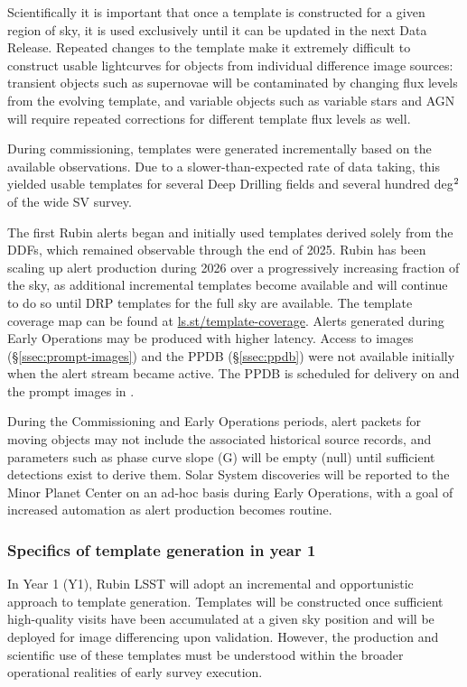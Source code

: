 Scientifically it is important that once a template is constructed for a given region of sky, it is used exclusively until it can be updated in the next Data Release.
Repeated changes to the template make it extremely difficult to construct usable lightcurves for objects from individual difference image sources: transient objects such as supernovae will be contaminated by changing flux levels from the evolving template, and variable objects such as variable stars and AGN will require repeated corrections for different template flux levels as well.

During commissioning, templates were generated incrementally based on the available observations.
Due to a slower-than-expected rate of data taking, this yielded usable templates for several Deep Drilling fields and several hundred deg$^{\rm 2}$ of the wide SV survey.

The first Rubin alerts began \rubinfirstalerts{} and initially used templates derived solely from the DDFs, which remained observable through the end of 2025.
Rubin has been scaling up alert production during 2026 over a progressively increasing fraction of the sky, as additional incremental templates become available and will continue to do so until DRP templates for the full sky are available.
The template coverage map can be found at \url{ls.st/template-coverage}.
Alerts generated during Early Operations may be produced with higher latency.
Access to images (\S\ref{ssec:prompt-images}) and the PPDB (\S\ref{ssec:ppdb}) were not available initially when the alert stream became active.
The PPDB is scheduled for delivery on \ppdbdate and the prompt images in  \npcdate.

During the Commissioning and Early Operations periods, alert packets for moving objects may not include the associated historical source records, and parameters such as phase curve slope (G) will be empty (null) until sufficient detections exist to derive them.
Solar System discoveries will be reported to the Minor Planet Center on an ad-hoc basis during Early Operations, with a goal of increased automation as alert production becomes routine.

\subsubsection{Specifics of template generation in year 1}

In Year 1 (Y1), Rubin LSST will adopt an incremental and opportunistic approach to template generation.
Templates will be constructed once sufficient high-quality visits have been accumulated at a given sky position and will be deployed for image differencing upon validation.
However, the production and scientific use of these templates must be understood within the broader operational realities of early survey execution.

